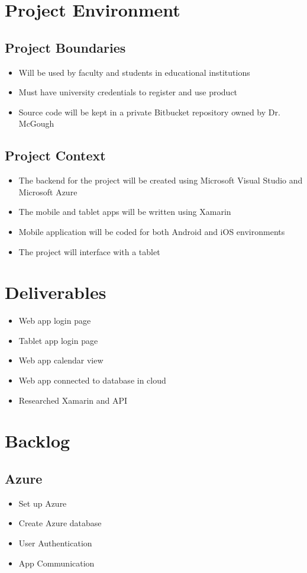 \documentclass{article}
\begin{document}
\section*{Project Environment}
\subsection*{Project Boundaries}
\begin{itemize}
	\item Will be used by faculty and students in educational institutions
	\item Must have university credentials to register and use product
	\item Source code will be kept in a private Bitbucket repository owned by Dr. McGough
\end{itemize}

\subsection*{Project Context}
\begin{itemize}
	\item The backend for the project will be created using Microsoft Visual Studio and Microsoft Azure
	\item The mobile and tablet apps will be written using Xamarin
	\item Mobile application will be coded for both Android and iOS environments
	\item The project will interface with a tablet
\end{itemize} 

\section*{Deliverables}
\begin{itemize}
	\item Web app login page
	\item Tablet app login page
	\item Web app calendar view
	\item Web app connected to database in cloud
	\item Researched Xamarin and API
\end{itemize}

\section*{Backlog}
\subsection*{Azure}
\begin{itemize}
	\item Set up Azure
	\item Create Azure database
	\item User Authentication
	\item App Communication
\end{itemize}
\end{document}

